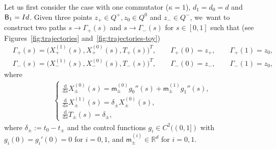 \documentclass[10pt]{amsart}
\theoremstyle{definition}
\newcommand\R{{\mathbb R}}
\newcommand{\sB}{{\mathsf B}}
\newcommand{\I}{\textup{Id}}\let\Id\I
\newcommand\ds{{\frac{\mathrm d}{\mathrm ds}}}
\begin{document}
Let us first consider the case with one commutator ($\kappa=1$),
$d_1=d_0=d$ and $\sB_1=\I$. Given three points
$z_+ \in Q^+, z_0 \in Q^0$ and $z_- \in Q^-$, we~want to
construct two paths $s \rightarrow \Gamma_+(s)$ and
$s \rightarrow \Gamma_-(s)$ for $s \in [0, 1]$ such that (see
Figures~\ref{fig:trajectories} and~\ref{fig:trajectories-toy})
\begin{equation*}
\begin{aligned}
& \Gamma_+(s) = \bigl(X^{(1)}_+(s), X^{(0)}_+(s),
T_+(s)\bigr)^T, \qquad \Gamma_+(0) = z_+, \qquad \Gamma_+(1) =
z_0,\\
& \Gamma_-(s) = \bigl(X^{(1)}_-(s), X^{(0)}_-(s),
T_-(s)\bigr)^T, \qquad \Gamma_-(0) = z_-, \qquad \Gamma_-(1) =
z_0,
\end{aligned}
\end{equation*}
where
\begin{equation}
\label{eq:control}
\begin{aligned}
\begin{cases}
\ds X^{(0)}_{\pm}(s)
= \mathsf m_\pm ^{(0)}
g_0''(s) +\mathsf m^{(1)}_\pm
g_1 ''(s), \\[2mm]
\ds X^{(1)}_\pm(s) = \delta_\pm X^{(0)}_\pm(s),\\[2mm]
\ds T_\pm(s) = \delta_\pm,
\end{cases}
\end{aligned}
\end{equation}
where $\delta_\pm := t_0 - t_\pm$ and the control functions
$g_i \in C^2((0,1])$ with $g_i(0)=g_i'(0)=0$ for $i=0,1$, and
$\mathsf m^{(i)} _\pm \in \R^d$ for $i=0,1$.
\end{document}
